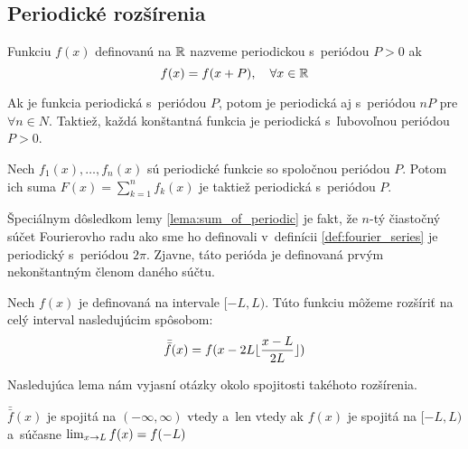 \subsection{Periodické rozšírenia}

\def\extension#1{\bar{\bar{#1}}}

\begin{definicia}
  Funkciu $f(x)$ definovanú na ${\mathbb R}$ nazveme periodickou s~periódou
  $P>0$ ak
  \begin{equation*}
    f(x) = f(x+P), \quad \forall x \in {\mathbb R}
  \end{equation*}
\end{definicia}
\begin{poznamka}
    Ak je funkcia periodická s~periódou $P$, potom je periodická
    aj s~periódou $nP$ pre $\forall n \in N$. 
    Taktiež, každá konštantná funkcia je periodická s~ľubovoľnou
    periódou $P>0$.
\end{poznamka}

\begin{lema}
    Nech $f_1(x), \dots, f_n(x)$ sú periodické funkcie so spoločnou
    periódou $P$. Potom ich suma $F(x) = \sum_{k=1}^n f_k(x)$
    je taktiež periodická s~periódou $P$.
    \label{lema:sum_of_periodic}
\end{lema}
Špeciálnym dôsledkom lemy \ref{lema:sum_of_periodic} je fakt, že
 $n$-tý čiastočný súčet Fourierovho radu ako sme ho definovali
 v~definícii \ref{def:fourier_series} je periodický s~periódou
 $2\pi$. Zjavne, táto perióda je definovaná prvým nekonštantným členom
 daného súčtu.

\begin{definicia}
    Nech $f(x)$ je definovaná na intervale $[-L,L)$. Túto funkciu
    môžeme rozšíriť na celý interval nasledujúcim spôsobom:
    \begin{equation*}
      \extension{f}(x) = f(x - 2L \floor{\frac{x-L}{2L}})
    \end{equation*}
\end{definicia}

Nasledujúca lema nám vyjasní otázky okolo spojitosti takéhoto
rozšírenia.
\begin{lema}
    $\extension{f}(x)$ je spojitá na $(-\infty,\infty)$ vtedy a~len
    vtedy ak $f(x)$ je spojitá na $[-L,L)$ a~súčasne 
    $\lim_{x\rightarrow L} f(x) = f(-L)$
\end{lema}


